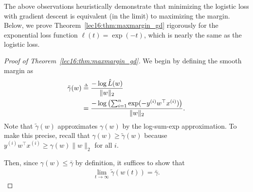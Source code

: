 The above observations heuristically demonstrate that minimizing the logistic loss with gradient descent is equivalent (in the limit) to maximizing the margin. Below, we prove Theorem~\ref{lec16:thm:maxmargin_gd} rigorously for the exponential loss function $\ell(t) = \exp(-t)$, which is nearly the same as the logistic loss.

\begin{proof}[Proof of Theorem~\ref{lec16:thm:maxmargin_gd}]
We begin by defining the smooth margin as
\begin{align}
    \tilde \gamma (w) &\defeq \frac{-\log \hat{L}(w)}{\|w\|_2} \label{lec18:eqn:smooth_margin} \\ 
    &=
    \frac{-\log\l( \sum_{i=1}^{n} \exp(-y^{(i)}w^\top x^{(i)})\r)}{\|w\|_2}.
\end{align}
Note that $\tilde\gamma(w)$ approximates $\gamma(w)$ by the log-sum-exp approximation. To make this precise, recall that $\gamma(w) \geq \tilde\gamma(w)$ because $y^{(i)}w^\top x^{(i)} \geq \gamma(w) \|w\|_2$ for all $i$.

Then, since $\gamma(w) \leq \bar\gamma$ by definition, it suffices to show that
\begin{align}
    \lim_{t\to\infty}\tilde\gamma(w(t)) = \bar\gamma. \label{lec18:eqn:target}
\end{align}


\end{proof}
